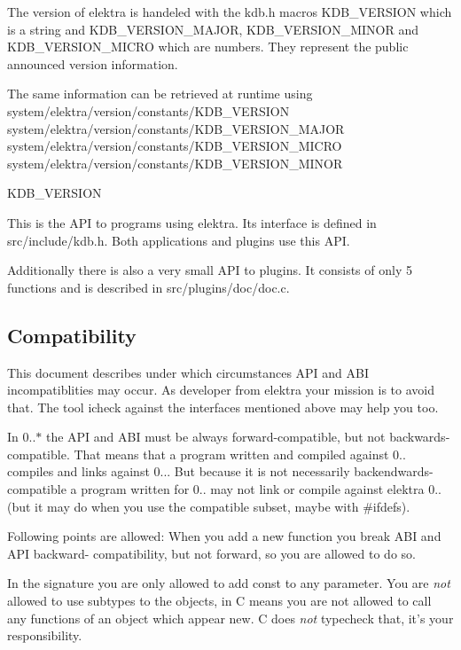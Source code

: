 The version of elektra is handeled with the kdb.\+h macros K\+D\+B\+\_\+\+V\+E\+R\+S\+I\+O\+N which is a string and K\+D\+B\+\_\+\+V\+E\+R\+S\+I\+O\+N\+\_\+\+M\+A\+J\+O\+R, K\+D\+B\+\_\+\+V\+E\+R\+S\+I\+O\+N\+\_\+\+M\+I\+N\+O\+R and K\+D\+B\+\_\+\+V\+E\+R\+S\+I\+O\+N\+\_\+\+M\+I\+C\+R\+O which are numbers. They represent the public announced version information.

The same information can be retrieved at runtime using system/elektra/version/constants/\+K\+D\+B\+\_\+\+V\+E\+R\+S\+I\+O\+N system/elektra/version/constants/\+K\+D\+B\+\_\+\+V\+E\+R\+S\+I\+O\+N\+\_\+\+M\+A\+J\+O\+R system/elektra/version/constants/\+K\+D\+B\+\_\+\+V\+E\+R\+S\+I\+O\+N\+\_\+\+M\+I\+C\+R\+O system/elektra/version/constants/\+K\+D\+B\+\_\+\+V\+E\+R\+S\+I\+O\+N\+\_\+\+M\+I\+N\+O\+R

K\+D\+B\+\_\+\+V\+E\+R\+S\+I\+O\+N

This is the A\+P\+I to programs using elektra. Its interface is defined in src/include/kdb.\+h. Both applications and plugins use this A\+P\+I.

Additionally there is also a very small A\+P\+I to plugins. It consists of only 5 functions and is described in src/plugins/doc/doc.\+c.

\subsection*{Compatibility}

This document describes under which circumstances A\+P\+I and A\+B\+I incompatiblities may occur. As developer from elektra your mission is to avoid that. The tool icheck against the interfaces mentioned above may help you too.

In 0..$\ast$ the A\+P\+I and A\+B\+I must be always forward-\/compatible, but not backwards-\/compatible. That means that a program written and compiled against 0.. compiles and links against 0... But because it is not necessarily backendwards-\/compatible a program written for 0.. may not link or compile against elektra 0.. (but it may do when you use the compatible subset, maybe with \#ifdefs).

Following points are allowed\+: When you add a new function you break A\+B\+I and A\+P\+I backward-\/ compatibility, but not forward, so you are allowed to do so.

In the signature you are only allowed to add const to any parameter. You are {\itshape not} allowed to use subtypes to the objects, in C means you are not allowed to call any functions of an object which appear new. C does {\itshape not} typecheck that, it's your responsibility.

